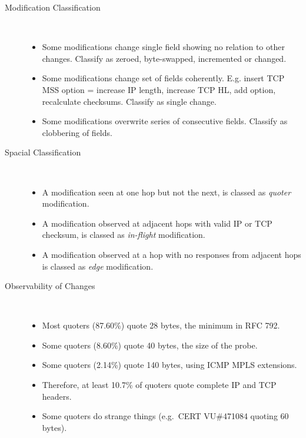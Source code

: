 \documentclass[portrait,a0b,final]{a0poster}
\newenvironment{poster}{
  \begin{center}
  \begin{minipage}[c]{0.98\textwidth}
}{
  \end{minipage} 
  \end{center}
}
\newenvironment{pcolumn}[1]{
  \begin{minipage}{#1\textwidth}
  \begin{center}
}{
  \end{center}
  \end{minipage}
}
\newcommand{\pbox}[4]{
\psshadowbox[#3]{
\begin{minipage}[t][#2][t]{#1}
#4
\end{minipage}
}}
\begin{document}
\begin{poster}
\begin{center}
\begin{pcolumn}{0.32}
{\begin{description}
\item[Modification Classification]\ \\[-1cm]
\begin{itemize}
\item Some modifications change single field showing no relation to
	other changes. Classify as zeroed, byte-swapped, incremented or
	changed.
\item Some modifications change set of fields coherently. E.g. insert
	TCP MSS option = increase IP length, increase TCP HL, add option,
	recalculate checksums. Classify as single change.
\item Some modifications overwrite series of consecutive fields. Classify
	as clobbering of fields.
\end{itemize}
\item[Spacial Classification]\ \\[-1cm]
\begin{itemize}
\item A modification seen at one hop but not the next, is classed
	as {\em quoter} modification.
\item A modification observed at adjacent hops with valid IP or TCP
	checksum, is classed as {\em in-flight} modification.
\item A modification observed at a hop with no responses from
	adjacent hops is classed as {\em edge} modification.
\end{itemize}
\item[Observability of Changes]\ \\[-1cm]
\begin{itemize}
\item Most quoters (87.60\%) quote 28 bytes, the minimum in RFC 792.
\item Some quoters (8.60\%) quote 40 bytes, the size of the probe.
\item Some quoters (2.14\%) quote 140 bytes, using ICMP MPLS extensions.
\item Therefore, at least 10.7\% of quoters quote complete IP and TCP headers.
\item Some quoters do strange things (e.g.~CERT VU\#471084 quoting 60 bytes).
\end{itemize}
\end{description}
}
\end{pcolumn}
\begin{pcolumn}{0.32}
\pbox{0.9\textwidth}{30cm}{linewidth=2mm,framearc=0.1,linecolor=lightblue,fillstyle=gradient,gradangle=0,gradbegin=white,gradend=white,gradmidpoint=1.0,framesep=1em}{

}
\end{pcolumn}
\end{center}
\end{poster}
\end{document}
